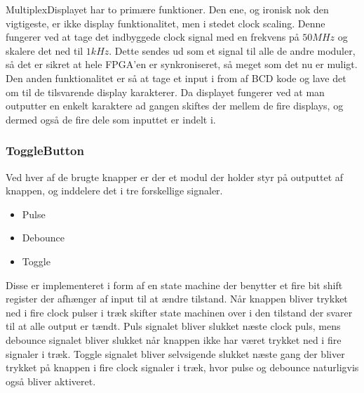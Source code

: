 MultiplexDisplayet har to primære funktioner. Den ene, og ironisk nok den vigtigeste, er ikke display funktionalitet, men i stedet clock scaling. Denne fungerer ved at tage det indbyggede clock signal med en frekvens på $50 MHz$ og skalere det ned til $1 kHz$. Dette sendes ud som et signal til alle de andre moduler, så det er sikret at hele FPGA'en er synkroniseret, så meget som det nu er muligt.
\\
Den anden funktionalitet er så at tage et input i from af BCD kode og lave det om til de tilsvarende display karakterer. Da displayet fungerer ved at man outputter en enkelt karaktere ad gangen skiftes der mellem de fire displays, og dermed også de fire dele som inputtet er indelt i.

\subsubsection{ToggleButton}

Ved hver af de brugte knapper er der et modul der holder styr på outputtet af knappen, og inddelere det i tre forskellige signaler.

\begin{itemize}
\item Pulse
\item Debounce
\item Toggle
\end{itemize}

Disse er implementeret i form af en state machine der benytter et fire bit shift register der afhænger af input til at ændre tilstand. Når knappen bliver trykket ned i fire clock pulser i træk skifter state machinen over i den tilstand der svarer til at alle output er tændt. Puls signalet bliver slukket næste clock puls, mens debounce signalet bliver slukket når knappen ikke har været trykket ned i fire signaler i træk. Toggle signalet bliver selvsigende slukket næste gang der bliver trykket på knappen i fire clock signaler i træk, hvor pulse og debounce naturligvis også bliver aktiveret.

